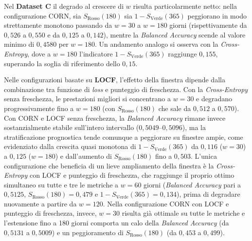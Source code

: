 \documentclass[a4paper,12pt]{report}
\begin{document}
Nel \textbf{Dataset C} il degrado al crescere di \(w\) risulta particolarmente netto: nella configurazione CORN, sia \(S_{\text{Rosso}}(180)\) sia \(1 - S_{\text{Verde}}(365)\) peggiorano in modo strettamente monotono passando da \(w=30\) a \(w=180\) giorni (rispettivamente da \(0{,}526\) a \(0{,}550\) e da \(0{,}125\) a \(0{,}142\)), mentre la \textit{Balanced Accuracy} scende al valore minimo di \(0{,}4580\) per \(w=180\). Un andamento analogo si osserva con la \textit{Cross-Entropy}, dove a \(w=180\) l'indicatore \(1 - S_{\text{Verde}}(365)\) raggiunge \(0{,}155\), superando la soglia di riferimento dello \(0{,}15\).

Nelle configurazioni basate su \textbf{LOCF}, l'effetto della finestra dipende dalla combinazione tra funzione di \textit{loss} e punteggio di freschezza. Con la \textit{Cross-Entropy} senza freschezza, le prestazioni migliori si concentrano a \(w=30\) e degradano progressivamente fino a \(w=180\) (con \(S_{\text{Rosso}}(180)\) che sale da \(0{,}512\) a \(0{,}570\)). Con CORN e LOCF senza freschezza, la \textit{Balanced Accuracy} rimane invece sostanzialmente stabile sull'intero intervallo (\(0{,}5049\)--\(0{,}5096\)), ma la stratificazione prognostica tende comunque a peggiorare su finestre ampie, come evidenziato dalla crescita quasi monotona di \(1 - S_{\text{Verde}}(365)\) da \(0{,}116\) (\(w=30\)) a \(0{,}125\) (\(w=180\)) e dall'aumento di \(S_{\text{Rosso}}(180)\) fino a \(0{,}503\). L'unica configurazione che beneficia di un lieve ampliamento della finestra è la \textit{Cross-Entropy} con LOCF e punteggio di freschezza, che raggiunge il proprio ottimo simultaneo su tutte e tre le metriche a \(w=60\) giorni (\textit{Balanced Accuracy} pari a \(0{,}5125\), \(S_{\text{Rosso}}(180)=0{,}479\) e \(1-S_{\text{Verde}}(365)=0{,}134\)), prima di degradare nuovamente a partire da \(w=120\). Nella configurazione CORN con LOCF e punteggio di freschezza, invece, \(w=30\) risulta già ottimale su tutte le metriche e l'estensione fino a 180 giorni comporta un calo della \textit{Balanced Accuracy} (da \(0{,}5131\) a \(0{,}5009\)) e un peggioramento di \(S_{\text{Rosso}}(180)\) (da \(0{,}453\) a \(0{,}499\)).
\end{document}
